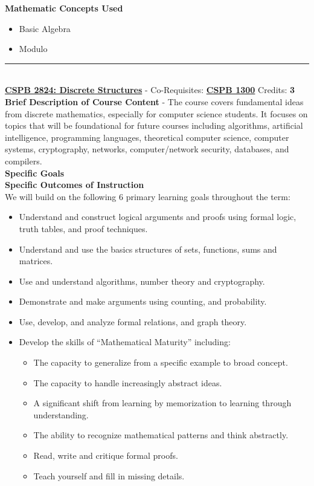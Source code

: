 \documentclass{article}
\newcommand{\horizontalline}{\noindent \rule{\textwidth}{0.5pt} \\}
\begin{document}
\noindent \textbf{Mathematic Concepts Used}
\begin{itemize}
    \item Basic Algebra
    \item Modulo
\end{itemize}

\horizontalline
\noindent \href{https://www.colorado.edu/program/cspb/cspb-2824-discrete-structures}{\textbf{CSPB 2824: Discrete Structures}} - Co-Requisites: \href{https://www.colorado.edu/program/cspb/cspb-1300-computer-science-1-starting-computing}{\textbf{CSPB 1300}} Credits: \textbf{3} \\

\noindent \textbf{Brief Description of Course Content} - The course covers fundamental ideas from discrete mathematics, especially for computer science students. It focuses on topics that will be foundational for future courses including algorithms, artificial intelligence, programming languages, theoretical computer science, computer systems, cryptography, networks, computer/network security, databases, and compilers. \\

\noindent \textbf{Specific Goals} \\

\noindent \textbf{Specific Outcomes of Instruction} \\
We will build on the following 6 primary learning goals throughout the term:
\begin{itemize}
    \item Understand and construct logical arguments and proofs using formal logic, truth tables, and proof techniques.
    \item Understand and use the basics structures of sets, functions, sums and matrices.
    \item Use and understand algorithms, number theory and cryptography.
    \item Demonstrate and make arguments using counting, and probability.
    \item Use, develop, and analyze formal relations, and graph theory.
    \item Develop the skills of “Mathematical Maturity” including:
    \begin{itemize}
        \item The capacity to generalize from a specific example to broad concept.
        \item The capacity to handle increasingly abstract ideas.
        \item A significant shift from learning by memorization to learning through understanding.
        \item The ability to recognize mathematical patterns and think abstractly.
        \item Read, write and critique formal proofs.
        \item Teach yourself and fill in missing details.
    \end{itemize}
\end{itemize}
\end{document}
